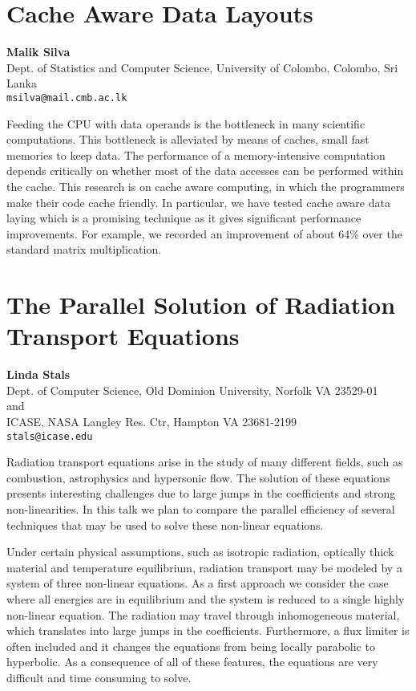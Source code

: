 \documentclass[11pt]{article}
\newcommand{\nextab}[4]{
	\section{#2}
	{\bf #1} \\ \nopagebreak
	{#3} \\ \nopagebreak
	{\tt #4} \nopagebreak
	}
\begin{document}

\nextab
{Malik Silva}
{Cache Aware Data Layouts}
{Dept. of Statistics and Computer Science, University of Colombo, Colombo, Sri Lanka}
{msilva@mail.cmb.ac.lk}


Feeding the CPU with data operands is the bottleneck in many
scientific computations.  This bottleneck is alleviated by means
of caches, small fast memories to keep data.  The performance of
a memory-intensive computation depends critically on whether
most of the data accesses can be performed within the cache.
This research is on cache aware computing, in which the
programmers make their code cache friendly.  In particular, we
have tested cache aware data laying which is a promising
technique as it gives significant performance improvements.  For
example, we recorded an improvement of about 64\% over the
standard matrix multiplication.



\nextab
{Linda Stals}
{The Parallel Solution of Radiation Transport Equations}
{Dept. of Computer Science, Old Dominion University, Norfolk VA 23529-01
\\ and \\ ICASE, NASA Langley Res. Ctr, Hampton VA 23681-2199}
{stals@icase.edu}


Radiation transport equations arise in the study of many different fields,
such as combustion, astrophysics and hypersonic flow. The solution of
these equations presents interesting challenges due to large jumps in the
coefficients and strong non-linearities. In this talk we plan to compare
the parallel efficiency of several techniques that may be used to solve
these non-linear equations.

Under certain physical assumptions, such
as isotropic radiation, optically thick material and temperature
equilibrium, radiation transport may be modeled by a system of three
non-linear equations. As a first approach we consider the case where all
energies are in equilibrium and the system is reduced to a single highly
non-linear equation. The radiation may travel through inhomogeneous
material, which translates into large jumps in the coefficients.
Furthermore, a flux limiter is often included and it changes the equations
from being locally parabolic to hyperbolic. As a consequence of all of
these features, the equations are very difficult and time
consuming to solve.
\end{document}

